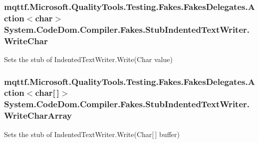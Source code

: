 \hypertarget{class_system_1_1_code_dom_1_1_compiler_1_1_fakes_1_1_stub_indented_text_writer_a36ba337cb48da0bf02e5a654c7d74a8a}{
\subsubsection[{Write\-Char}]{\setlength{\rightskip}{0pt plus 5cm}mqttf.\-Microsoft.\-Quality\-Tools.\-Testing.\-Fakes.\-Fakes\-Delegates.\-Action$<$char$>$ System.\-Code\-Dom.\-Compiler.\-Fakes.\-Stub\-Indented\-Text\-Writer.\-Write\-Char}}\label{class_system_1_1_code_dom_1_1_compiler_1_1_fakes_1_1_stub_indented_text_writer_a36ba337cb48da0bf02e5a654c7d74a8a}


Sets the stub of Indented\-Text\-Writer.\-Write(\-Char value)

\hypertarget{class_system_1_1_code_dom_1_1_compiler_1_1_fakes_1_1_stub_indented_text_writer_a6f9f956d2af2255446ee9b8aaa486ee4}{
\subsubsection[{Write\-Char\-Array}]{\setlength{\rightskip}{0pt plus 5cm}mqttf.\-Microsoft.\-Quality\-Tools.\-Testing.\-Fakes.\-Fakes\-Delegates.\-Action$<$char\mbox{[}$\,$\mbox{]}$>$ System.\-Code\-Dom.\-Compiler.\-Fakes.\-Stub\-Indented\-Text\-Writer.\-Write\-Char\-Array}}\label{class_system_1_1_code_dom_1_1_compiler_1_1_fakes_1_1_stub_indented_text_writer_a6f9f956d2af2255446ee9b8aaa486ee4}


Sets the stub of Indented\-Text\-Writer.\-Write(\-Char\mbox{[}$\,$\mbox{]} buffer)

